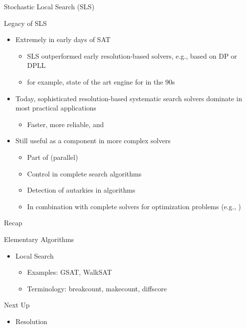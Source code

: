 \documentclass[t]{sdqbeamer}
\begin{document}
\begin{frame}{Stochastic Local Search (SLS)}
\begin{block}{Legacy of SLS}
\begin{itemize}\setlength{\itemsep}{1em}
	\item<1-> Extremely  in early days of SAT
	\begin{itemize}\setlength{\itemsep}{1ex}
		\item SLS outperformed early resolution-based solvers, e.g., based on DP or DPLL
		\item for example, state of the art engine for  in the 90s
	\end{itemize}
	\item<2-> Today, sophisticated resolution-based systematic search solvers dominate in most practical applications
	\begin{itemize}\setlength{\itemsep}{1ex}
		\item Faster, more reliable, and 
	\end{itemize}
	\item<3-> Still useful as a component in more complex solvers
	\begin{itemize}\setlength{\itemsep}{1ex}
		\item Part of (parallel) 
		\item Control  in complete search algorithms
		\item Detection of autarkies in  algorithms
		\item In combination with complete solvers for optimization problems (e.g., )
	\end{itemize}
\end{itemize}
\end{block}
\end{frame}

\begin{frame}{Recap}
\begin{block}{Elementary Algorithms}
	\begin{itemize}\setlength{\itemsep}{1em}
		\item Local Search
		\begin{itemize}\setlength{\itemsep}{1ex}
			\item Examples: GSAT, WalkSAT
			\item Terminology: breakcount, makecount, diffscore
		\end{itemize}
	\end{itemize}
\end{block}
\pause
\begin{block}{Next Up}
	\begin{itemize}\setlength{\itemsep}{1em}
		\item Resolution
	\end{itemize}
\end{block}
\end{frame}
\end{document}
